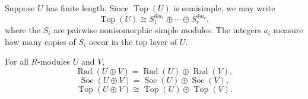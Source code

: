 \begin{example}
    Suppose $U$ has finite length. Since $\operatorname{Top}(U)$ is semisimple, we may write
    \[
        \operatorname{Top}(U)
        \cong
        S_1^{\oplus a_1}\oplus \cdots \oplus S_r^{\oplus a_r},
    \]
    where the $S_i$ are pairwise nonisomorphic simple modules. The integers $a_i$
    measure how many copies of $S_i$ occur in the top layer of $U$.
\end{example}

\begin{lemma}
    For all $R$-modules $U$ and $V$,
    \[
        \operatorname{Rad}(U\oplus V)
        =
        \operatorname{Rad}(U)\oplus \operatorname{Rad}(V),
    \]
    \[
        \operatorname{Soc}(U\oplus V)
        =
        \operatorname{Soc}(U)\oplus \operatorname{Soc}(V),
    \]
    \[
        \operatorname{Top}(U\oplus V)
        \cong
        \operatorname{Top}(U)\oplus \operatorname{Top}(V).
    \]
\end{lemma}

